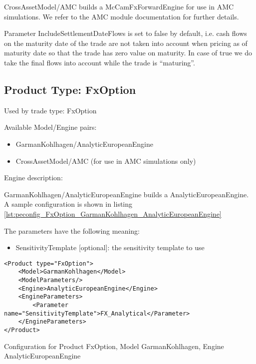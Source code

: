 CrossAssetModel/AMC builds a McCamFxForwardEngine for use in AMC simulations. We refer to the AMC module documentation
for further details.

Parameter IncludeSettlementDateFlows is set to false by default, i.e. cash flows on the maturity date of the trade are
not taken into account when pricing as of maturity date so that the trade has zero value on maturity. In case of true
we do take the final flows into account while the trade is ``maturing''.

\subsection{Product Type: FxOption}

Used by trade type: FxOption

Available Model/Engine pairs:

\begin{itemize}
\item GarmanKohlhagen/AnalyticEuropeanEngine
\item CrossAssetModel/AMC (for use in AMC simulations only)
\end{itemize}

Engine description:

GarmanKohlhagen/AnalyticEuropeanEngine builds a AnalyticEuropeanEngine. A sample configuration is shown in listing
\ref{lst:peconfig_FxOption_GarmanKohlhagen_AnalyticEuropeanEngine}

The parameters have the following meaning:

\begin{itemize}
\item SensitivityTemplate [optional]: the sensitivity template to use 
\end{itemize}

\begin{longlisting}
\begin{verbatim}
<Product type="FxOption">
    <Model>GarmanKohlhagen</Model>
    <ModelParameters/>
    <Engine>AnalyticEuropeanEngine</Engine>
    <EngineParameters>
        <Parameter name="SensitivityTemplate">FX_Analytical</Parameter>
    </EngineParameters>
</Product>
\end{verbatim}
\caption{Configuration for Product FxOption, Model GarmanKohlhagen, Engine AnalyticEuropeanEngine}
\label{lst:peconfig_FxOption_GarmanKohlhagen_AnalyticEuropeanEngine}
\end{longlisting}

